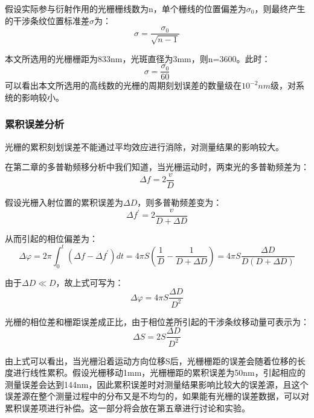 \documentclass[type=master,oneside]{fduthesis}
\begin{document}
假设实际参与衍射作用的光栅栅线数为n，单个栅线的位置偏差为$\sigma_{0}$，则最终产生的干涉条纹位置标准差$\sigma$为：
\begin{equation}
  \sigma=\frac{\sigma_{0}}{\sqrt{n-1}}
\end{equation}

本文所选用的光栅栅距为833nm，光斑直径为3mm，则n=3600。此时：
\begin{equation}
  \sigma=\frac{\sigma_{0}}{60}
\end{equation}
可以看出本文所选用的高线数的光栅的周期刻划误差的数量级在$10^{-2}nm$级，对系统的影响较小。

\subsubsection{累积误差分析}
光栅的累积刻划误差不能通过平均效应进行消除，对测量结果的影响较大。

在第二章的多普勒频移分析中我们知道，当光栅运动时，两束光的多普勒频差为：
\begin{equation}
  \Delta f=2 \frac{v}{D}
\end{equation}

假设光栅入射位置的累积误差为$\Delta D$，则多普勒频差变为：
\begin{equation}
  \Delta f^{\prime}=2 \frac{v}{D+\Delta D}
\end{equation}

从而引起的相位偏差为：
\begin{equation}
  \Delta \varphi=2 \pi \int_{0}^{t}\left(\Delta f-\Delta f^{\prime}\right) d t=4 \pi S\left(\frac{1}{D}-\frac{1}{D+\Delta D}\right)=4 \pi S \frac{\Delta D}{D(D+\Delta D)}
\end{equation}

由于$\Delta D \ll D$，故上式可写为：
\begin{equation}
  \Delta \varphi=4 \pi S \frac{\Delta D}{D^{2}}
\end{equation}

光栅的相位差和栅距误差成正比，由于相位差所引起的干涉条纹移动量可表示为：
\begin{equation}
  \Delta S=2S \frac{\Delta D}{D^{2}}
\end{equation}

由上式可以看出，当光栅沿着运动方向位移S后，光栅栅距的误差会随着位移的长度进行线性累积。假设光栅移动1mm，光栅栅距的累积误差为50nm，引起相应的测量误差会达到144nm，因此累积误差时对测量结果影响比较大的误差源，且这个误差源在整个测量过程中的分布又是不均匀的，如果能有光栅的误差数据，可以对累积误差项进行补偿。这一部分将会放在第五章进行讨论和实验。
\end{document}
